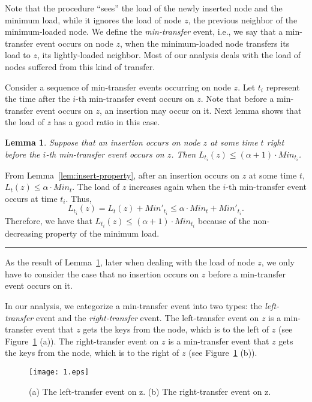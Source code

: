 \documentclass[a4paper]{article}
\newtheorem{lemma}{Lemma}
\newenvironment{proof}{{\bf Proof:}}{\hfill\rule{1.5mm}{3mm}\vspace{0.1in}}
\begin{document}
Note that the {\minbalance} procedure ``sees'' the load of the newly inserted node
and the minimum load, while it ignores the load of node $z$, the
previous neighbor of the minimum-loaded node. We define the
{\em min-transfer} event, i.e., we say that a min-transfer event occurs
on node $z$, when the minimum-loaded node transfers its load to $z$,
its lightly-loaded neighbor. Most of our analysis deals with the load
of nodes suffered from this kind of transfer.

Consider a sequence of min-transfer events occurring on node $z$.
Let $t_i$ represent the time after the $i$-th min-transfer event occurs
on $z$. Note that before a min-transfer event occurs on $z$, an insertion may
occur on it.  Next lemma shows that the load of $z$ has a good ratio
in this case.

\begin{lemma}
  \label{lem:insert-between-min-transfer}
Suppose that an insertion occurs on node  $z$ at some time $t$
right before the $i$-th min-transfer event occurs on $z$. Then
$L_{t_{i}}(z)\leq(\alpha + 1)\cdot Min_{t_{i}}$.
\end{lemma}

\begin{proof}
  From Lemma~\ref{lem:insert-property}, after an insertion occurs
  on $z$ at some time $t$, $L_{t}(z)\leq\alpha\cdot Min_{t}$. The load of $z$
  increases again when the $i$-th min-transfer event occurs  at
  time $t_i$.  Thus,
  \[
  L_{t_{i}}(z)=L_t(z)+ Min'_{t_{i}} \leq \alpha\cdot Min_{t} +
  Min'_{t_{i}}.
  \]
  Therefore, we have that $L_{t_{i}}(z) \leq (\alpha+1)\cdot
  Min_{t_i}$ because of the non-decreasing property of the minimum load.
\end{proof}

As the result of Lemma~\ref{lem:insert-between-min-transfer}, later
when dealing with the load of node $z$, we only have to consider the case
that no insertion occurs on $z$ before a min-transfer event occurs
on it.

In our analysis, we categorize a min-transfer event into two types:
the {\em left-transfer} event and the {\em right-transfer} event. The
left-transfer event on $z$ is a min-transfer event that $z$ gets the
keys from the node, which is to the left of $z$ (see
Figure~\ref{fig:1} (a)). The right-transfer event on $z$ is
a min-transfer event that $z$ gets the keys from the node, which is
to the right of $z$ (see Figure~\ref{fig:1} (b)).

\begin{figure}
  \centering \texttt{[image: 1.eps]}
  \caption{(a) The left-transfer event on z. (b) The right-transfer
    event on z.}
  \label{fig:1}
\end{figure}
\end{document}
